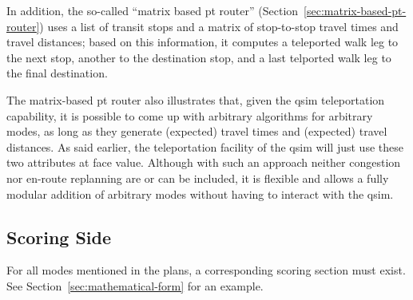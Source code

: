 In addition, the so-called ``matrix based pt router'' (Section~\ref{sec:matrix-based-pt-router}) uses a list of transit stops and a matrix of stop-to-stop travel times and travel distances; based on this information, it computes a teleported walk leg to the next stop, another to the destination stop, and a last telported walk leg to the final destination.

The matrix-based pt router also illustrates that, given the \gls{qsim} teleportation capability, it is possible to come up with arbitrary algorithms for arbitrary modes, as long as they generate (expected) travel times and (expected) travel distances.  As said earlier, the \gls{teleportation} facility of the \gls{qsim} will just use these two attributes at face value.  Although with such an approach neither congestion nor en-route replanning are or can be included, it is flexible and allows a fully modular addition of arbitrary modes without having to interact with the \gls{qsim}.

\subsection{Scoring Side}
For all modes mentioned in the plans, a corresponding scoring section must exist.  See Section~\ref{sec:mathematical-form} for an example.

